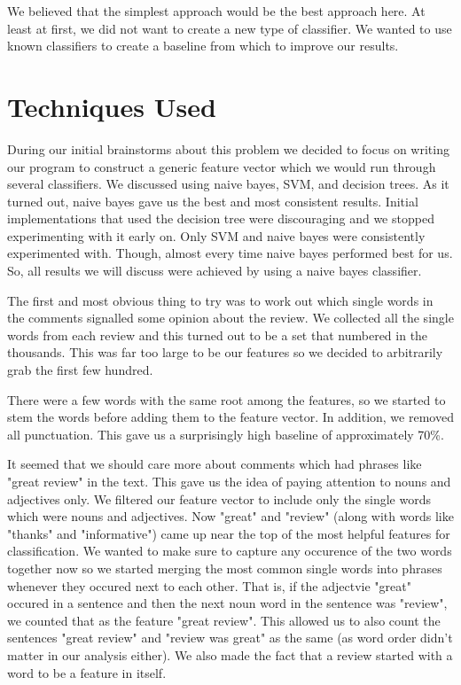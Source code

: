 \documentclass[]{report}
\begin{document}
We believed that the simplest approach would be the best approach here.  At least at first, we did not want to create a new type of classifier.  We wanted to use known classifiers to create a baseline from which to improve our results. 

\section{Techniques Used}

During our initial brainstorms about this problem we decided to focus on writing our program to construct a generic feature vector which we would run through several classifiers.  We discussed using naive bayes, SVM, and decision trees.  As it turned out, naive bayes gave us the best and most consistent results.  Initial implementations that used the decision tree were discouraging and we stopped experimenting with it early on.  Only SVM and naive bayes were consistently experimented with.  Though, almost every time naive bayes performed best for us.  So, all results we will discuss were achieved by using a naive bayes classifier.

The first and most obvious thing to try was to work out which single words in the comments signalled some opinion about the review.  We collected all the single words from each review and this turned out to be a set that numbered in the thousands.  This was far too large to be our features so we decided to arbitrarily grab the first few hundred.  

There were a few words with the same root among the features, so we started to stem the words before adding them to the feature vector.  In addition, we removed all punctuation.  This gave us a surprisingly high baseline of approximately 70\%.

It seemed that we should care more about comments which had phrases like "great review" in the text.  This gave us the idea of paying attention to nouns and adjectives only.  We filtered our feature vector to include only the single words which were nouns and adjectives.  Now "great" and "review" (along with words like "thanks" and "informative") came up near the top of the most helpful features for classification.  We wanted to make sure to capture any occurence of the two words together now so we started merging the most common single words into phrases whenever they occured next to each other.  That is, if the adjectvie "great" occured in a sentence and then the next noun word in the sentence was "review", we counted that as the feature "great review".  This allowed us to also count the sentences "great review" and "review was great" as the same (as word order didn't matter in our analysis either).  We also made the fact that a review started with a word to be a feature in itself.
\end{document}

